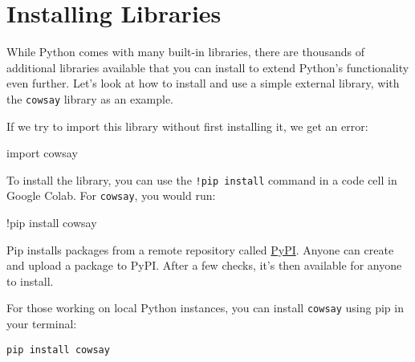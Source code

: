 \documentclass[
  letterpaper,
  DIV=11,
  numbers=noendperiod]{scrreprt}
\newenvironment{Shaded}{\begin{snugshade}}{\end{snugshade}}
\newcommand{\ImportTok}[1]{\textcolor[rgb]{0.00,0.46,0.62}{#1}}
\newcommand{\NormalTok}[1]{\textcolor[rgb]{0.00,0.23,0.31}{#1}}
\newcommand{\OperatorTok}[1]{\textcolor[rgb]{0.37,0.37,0.37}{#1}}
\begin{document}
\section{Installing Libraries}\label{installing-libraries}

While Python comes with many built-in libraries, there are thousands of
additional libraries available that you can install to extend Python's
functionality even further. Let's look at how to install and use a
simple external library, with the \texttt{cowsay} library as an example.

If we try to import this library without first installing it, we get an
error:

\begin{Shaded}
\begin{Highlighting}[]
\ImportTok{import}\NormalTok{ cowsay}
\end{Highlighting}
\end{Shaded}

To install the library, you can use the \texttt{!pip\ install} command
in a code cell in Google Colab. For \texttt{cowsay}, you would run:

\begin{Shaded}
\begin{Highlighting}[]
\OperatorTok{!}\NormalTok{pip install cowsay}
\end{Highlighting}
\end{Shaded}

Pip installs packages from a remote repository called
\href{https://pypi.org/}{PyPI}. Anyone can create and upload a package
to PyPI. After a few checks, it's then available for anyone to install.

\begin{tcolorbox}[enhanced jigsaw, colframe=quarto-callout-note-color-frame, opacityback=0, titlerule=0mm, bottomrule=.15mm, breakable, leftrule=.75mm, colbacktitle=quarto-callout-note-color!10!white, title=\textcolor{quarto-callout-note-color}{\faInfo}\hspace{0.5em}{Side-note}, rightrule=.15mm, coltitle=black, opacitybacktitle=0.6, colback=white, left=2mm, arc=.35mm, toptitle=1mm, bottomtitle=1mm, toprule=.15mm]

For those working on local Python instances, you can install
\texttt{cowsay} using pip in your terminal:

\begin{verbatim}
pip install cowsay
\end{verbatim}

\end{tcolorbox}
\end{document}

